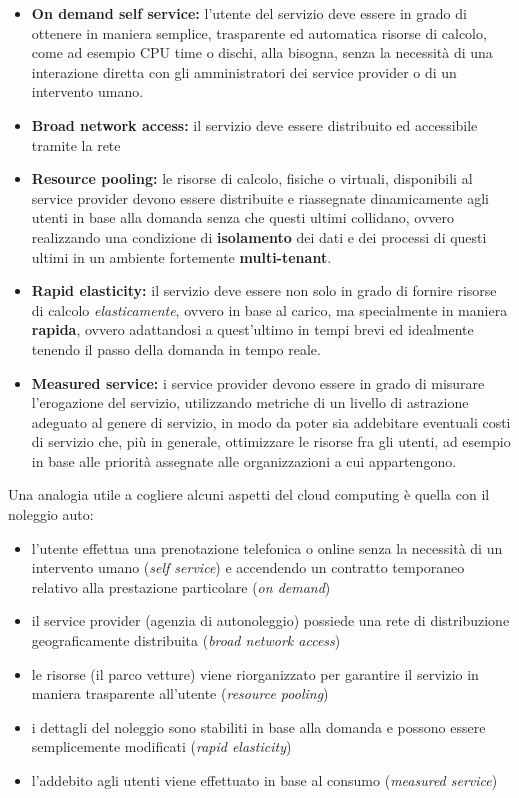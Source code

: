 \documentclass[italian,]{article}
\providecommand{\tightlist}{%
  \setlength{\itemsep}{0pt}\setlength{\parskip}{0pt}}
\begin{document}
\begin{itemize}
\tightlist
\item
  \textbf{On demand self service:} l'utente del servizio deve essere in
  grado di ottenere in maniera semplice, trasparente ed automatica
  risorse di calcolo, come ad esempio CPU time o dischi, alla bisogna,
  senza la necessità di una interazione diretta con gli amministratori
  dei service provider o di un intervento umano.
\item
  \textbf{Broad network access:} il servizio deve essere distribuito ed
  accessibile tramite la rete
\item
  \textbf{Resource pooling:} le risorse di calcolo, fisiche o virtuali,
  disponibili al service provider devono essere distribuite e
  riassegnate dinamicamente agli utenti in base alla domanda senza che
  questi ultimi collidano, ovvero realizzando una condizione di
  \textbf{isolamento} dei dati e dei processi di questi ultimi in un
  ambiente fortemente \textbf{multi-tenant}.
\item
  \textbf{Rapid elasticity:} il servizio deve essere non solo in grado
  di fornire risorse di calcolo \emph{elasticamente}, ovvero in base al
  carico, ma specialmente in maniera \textbf{rapida}, ovvero adattandosi
  a quest'ultimo in tempi brevi ed idealmente tenendo il passo della
  domanda in tempo reale.
\item
  \textbf{Measured service:} i service provider devono essere in grado
  di misurare l'erogazione del servizio, utilizzando metriche di un
  livello di astrazione adeguato al genere di servizio, in modo da poter
  sia addebitare eventuali costi di servizio che, più in generale,
  ottimizzare le risorse fra gli utenti, ad esempio in base alle
  priorità assegnate alle organizzazioni a cui appartengono.
\end{itemize}

Una analogia utile a cogliere alcuni aspetti del cloud computing è
quella con il noleggio auto:

\begin{itemize}
\tightlist
\item
  l'utente effettua una prenotazione telefonica o online senza la
  necessità di un intervento umano (\emph{self service}) e accendendo un
  contratto temporaneo relativo alla prestazione particolare (\emph{on
  demand})
\item
  il service provider (agenzia di autonoleggio) possiede una rete di
  distribuzione geograficamente distribuita (\emph{broad network
  access})
\item
  le risorse (il parco vetture) viene riorganizzato per garantire il
  servizio in maniera trasparente all'utente (\emph{resource pooling})
\item
  i dettagli del noleggio sono stabiliti in base alla domanda e possono
  essere semplicemente modificati (\emph{rapid elasticity})
\item
  l'addebito agli utenti viene effettuato in base al consumo
  (\emph{measured service})
\end{itemize}
\end{document}
